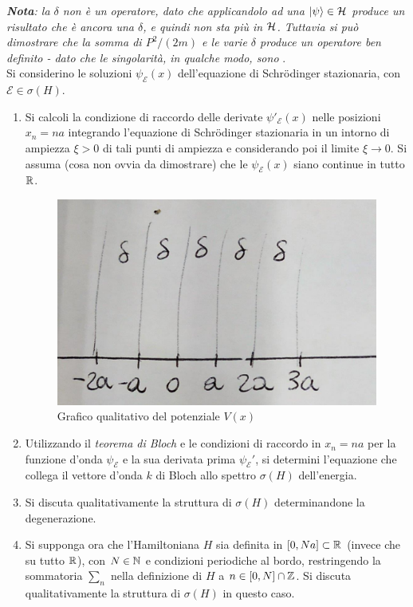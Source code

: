 \documentclass[../../FisicaTeorica.tex]{subfiles}
\begin{document}
\textit{\textbf{Nota}: la $\delta$ non è un operatore, dato che applicandolo ad una $\Ket{\psi}\in \mathcal{H}$ produce un risultato che è ancora una $\delta$, e quindi non sta più in $\mathcal{H}$. Tuttavia si può dimostrare che la somma di $P^2/(2m)$ e le varie $\delta$ produce un operatore ben definito - dato che le singolarità, in qualche modo, sono }.\\

Si considerino le soluzioni $\psi_\mathcal{E}(x)$ dell'equazione di Schr\"odinger stazionaria, con $\mathcal{E}\in \sigma(H)$.

\begin{enumerate}
\item Si calcoli la condizione di raccordo delle derivate $\psi'_\mathcal{E}(x)$ nelle posizioni \hbox{$x_n=na$} integrando l'equazione di Schr\"odinger stazionaria in un intorno di ampiezza $\xi > 0$ di tali punti di ampiezza e considerando poi il limite $\xi\to 0$. Si assuma (cosa non ovvia da dimostrare) che le $\psi_\mathcal{E}(x)$ siano continue in tutto $\mathbb{R}$.
\begin{figure}[H]
\centering
\includegraphics[scale=0.4]{Immagini/13_12/image001.jpg}
\caption{Grafico qualitativo del potenziale $V(x)$}
\end{figure}
\item Utilizzando il \textit{teorema di Bloch} e le condizioni di raccordo in $x_n = na$ per la funzione d'onda $\psi_\mathcal{E}$ e la sua derivata prima $\psi_\mathcal{E}'$, si determini l'equazione che collega il vettore d'onda $k$ di Bloch allo spettro $\sigma(H)$ dell'energia.
\item Si discuta qualitativamente la struttura di $\sigma(H)$ determinandone la degenerazione.
\item Si supponga ora che l'Hamiltoniana $H$ sia definita in $[0,Na] \subset \mathbb{R}$ (invece che su tutto $\mathbb{R}$), con $N \in \mathbb{N}$ e condizioni periodiche al bordo, restringendo la sommatoria $\sum_n$ nella definizione di $H$ a $n \in [0,N] \cap \mathbb{Z}$. Si discuta qualitativamente la struttura di $\sigma(H)$ in questo caso. 
\end{enumerate}
\end{document}
